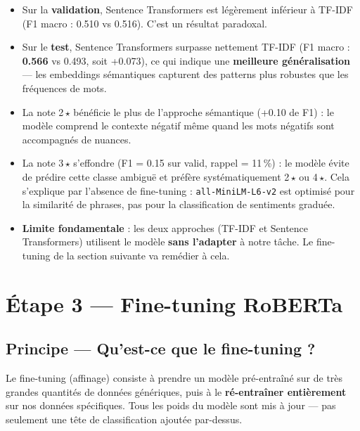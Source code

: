 \documentclass[12pt, a4paper]{article}
\begin{document}
\begin{itemize}
  \item Sur la \textbf{validation}, Sentence Transformers est légèrement inférieur à
        TF-IDF (F1 macro : 0.510 vs 0.516). C'est un résultat paradoxal.
  \item Sur le \textbf{test}, Sentence Transformers surpasse nettement TF-IDF
        (F1 macro : \textbf{0.566} vs 0.493, soit +0.073), ce qui indique
        une \textbf{meilleure généralisation} — les embeddings sémantiques capturent
        des patterns plus robustes que les fréquences de mots.
  \item La note 2\,$\star$ bénéficie le plus de l'approche sémantique (+0.10 de F1) :
        le modèle comprend le contexte négatif même quand les mots négatifs sont
        accompagnés de nuances.
  \item La note 3\,$\star$ s'effondre (F1 = 0.15 sur valid, rappel = 11\,\%) : le modèle
        évite de prédire cette classe ambiguë et préfère systématiquement 2\,$\star$ ou 4\,$\star$.
        Cela s'explique par l'absence de fine-tuning : \texttt{all-MiniLM-L6-v2} est
        optimisé pour la similarité de phrases, pas pour la classification de sentiments graduée.
  \item \textbf{Limite fondamentale} : les deux approches (TF-IDF et Sentence Transformers)
        utilisent le modèle \textbf{sans l'adapter} à notre tâche. Le fine-tuning
        de la section suivante va remédier à cela.
\end{itemize}

\section{Étape 3 — Fine-tuning RoBERTa}
\label{sec:bert}

\subsection{Principe — Qu'est-ce que le fine-tuning ?}

Le fine-tuning (affinage) consiste à prendre un modèle pré-entraîné sur de très grandes
quantités de données génériques, puis à le \textbf{ré-entraîner entièrement} sur nos
données spécifiques. Tous les poids du modèle sont mis à jour — pas seulement une tête
de classification ajoutée par-dessus.
\end{document}

